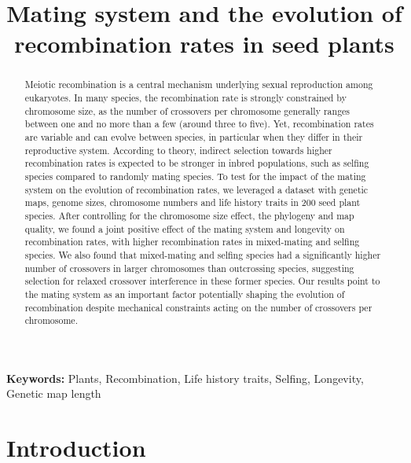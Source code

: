\documentclass{article}
\title{Mating system and the evolution of recombination rates in seed plants}
\begin{document}
\maketitle



\begin{abstract}
Meiotic recombination is a central mechanism underlying sexual reproduction among eukaryotes. In many species, the recombination rate is strongly constrained by chromosome size, as the number of crossovers per chromosome generally ranges between one and no more than a few (around three to five). Yet, recombination rates are variable and can evolve between species, in particular when they differ in their reproductive system. According to theory, indirect selection towards higher recombination rates is expected to be stronger in inbred populations, such as selfing species compared to randomly mating species. To test for the impact of the mating system on the evolution of recombination rates, we leveraged a dataset with genetic maps, genome sizes, chromosome numbers and life history traits in 200 seed plant species. After controlling for the chromosome size effect, the phylogeny and map quality, we found a joint positive effect of the mating system and longevity on recombination rates, with higher recombination rates in mixed-mating and selfing species. We also found that mixed-mating and selfing species had a significantly higher number of crossovers in larger chromosomes than outcrossing species, suggesting selection for relaxed crossover interference in these former species. Our results point to the mating system as an important factor potentially shaping the evolution of recombination despite mechanical constraints acting on the number of crossovers per chromosome.
\end{abstract}




\textbf{Keywords:} Plants, Recombination, Life history traits, Selfing, Longevity, Genetic map length\\





\newpage



\section*{Introduction}
\end{document}
